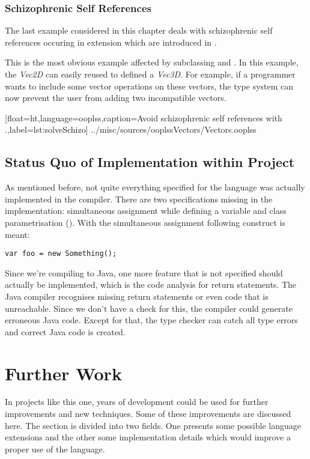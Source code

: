 \subsubsection{Schizophrenic Self References}
The last example considered in this chapter deals with schizophrenic self
references occuring in extension which are introduced in .

This is the most obvious example affected by subclassing and
\mytype. In this example, the \emph{Vec2D} can easily reused to defined a
\emph{Vec3D}. For example, if a programmer wants to include some vector
operations on these vectors, the type system can now prevent the user
from adding two incompatible vectors.


[float=ht,language=ooplss,caption=Avoid schizophrenic self references with \mytype.,label=lst:solveSchizo]
{../misc/sources/ooplssVectors/Vectors.ooplss}

\subsection{Status Quo of Implementation within Project}
\label{sec:statusQuo}

As mentioned before, not quite everything specified for the language
was actually implemented in the compiler. There are two specifications missing
in the implementation: simultaneous assignment while defining a variable
and class parametrisation (). With the simultaneous
assignment following construct is meant:

\begin{lstlisting}[float=ht,language=ooplss,caption=Assignment on defining a variable.,label=lst:vardefAssign]
var foo = new Something();
\end{lstlisting}

Since we're compiling to Java, one more feature that
is not specified should actually be implemented, which is the code analysis
for return statements. The Java compiler recognises missing return statements
or even code that is unreachable. Since we don't have a check for this, the
compiler could generate erroneous Java code. Except for that, the type checker
can catch all type errors and correct Java code is created.

\section{Further Work}
\label{sec:futureWork}
In projects like this one, years of development could be used for
further improvements and new techniques. Some of these improvements are
discussed here. The section is divided into two fields. One presents some
possible language extensions and the other some implementation details
which would improve a proper use of the language.

